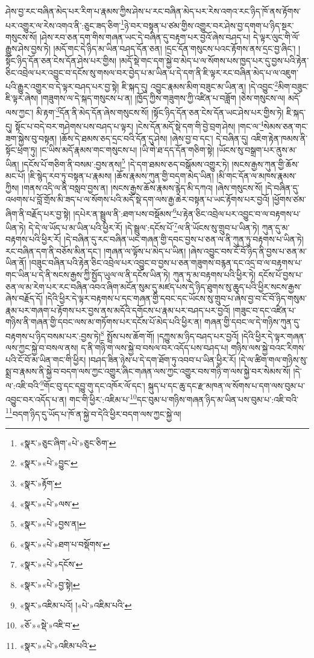 ཤེས་བྱ་རང་བཞིན་མེད་པར་རིག་པ་རྣམས་ཀྱིས་ཤེས་པ་རང་བཞིན་མེད་པར་རེས་འགའ་རང་ཉིད་ཁོ་ནས་རྟོགས་པར་འགྱུར་ལ་རེས་འགའ་ནི་:ཅུང་ཟད་ཅིག་\footnote{«སྣར་»ཅུང་ཞིག་«པེ་»ཅུང་ཅིག་}ཉེ་བར་བསྟན་པ་ཙམ་གྱིས་འགྱུར་བར་ཤེས་བྱ་དགག་པ་ཉིད་སྔར་གསུངས་སོ། །ཤེས་རབ་ཅན་དག་གིས་གཞན་ཡང་དེ་བཞིན་དུ་བརྟག་པར་བྱའོ་ཞེས་བཤད་པ། དེ་ལྟར་ལུང་གི་ལོ་རྒྱུས་ཤེས་བྱས་ཏེ། །མདོ་གང་དེ་ཉིད་མ་ཡིན་བཤད་དོན་ཅན། །དྲང་དོན་གསུངས་པའང་རྟོགས་ནས་དྲང་བྱ་ཞིང་། །སྟོང་ཉིད་དོན་ཅན་ངེས་དོན་ཤེས་པར་གྱིས། །མདོ་སྡེ་གང་དག་སྐྱེ་བ་མེད་པ་ལ་སོགས་པས་ཁྱད་པར་དུ་བྱས་པའི་རྟེན་ཅིང་འབྲེལ་པར་འབྱུང་བ་དངོས་སུ་གསལ་བར་བྱེད་པ་མ་ཡིན་པ་དེ་དག་ནི་ཇི་ལྟར་རང་བཞིན་མེད་པ་ལ་འཇུག་པའི་རྒྱུར་འགྱུར་བ་དེ་ལྟར་བཤད་པར་བྱ་སྟེ། ཇི་སྐད་དུ། འབྱུང་རྣམས་མིག་བཟུང་མ་ཡིན་ན། །དེ་འབྱུང་\footnote{«སྣར་»«པེ་»བྱུང་}མིག་བཟུང་ཇི་ལྟར་ཞེས། །གཟུགས་ལ་དེ་སྐད་གསུངས་པ་ན། །ཁྱོད་ཀྱིས་གཟུགས་ཀྱི་འཛིན་པ་བཟློག །ཅེས་གསུངས་ལ། མདོ་ལས་ཀྱང་། མི་རྟག་\footnote{«སྣར་»རྟོག་}དོན་ནི་མེད་དོན་ཞེས་གསུངས་སོ། །སྟོང་ཉིད་དོན་ཅན་ངེས་དོན་ཡང་ཤེས་པར་གྱིས་ཏེ། ཇི་སྐད་དུ། སྟོང་པ་བདེ་བར་གཤེགས་པས་བཤད་པ་ལྟར། །ངེས་དོན་མདོ་སྡེ་དག་གི་བྱེ་བྲག་ཤེས། །གང་ལ་\footnote{«སྣར་»«པེ་»ལས་}སེམས་ཅན་གང་ཟག་སྐྱེས་བུ་བསྟན། །ཆོས་དེ་ཐམས་ཅད་དྲང་བའི་དོན་དུ་ཤེས། །ཞེས་བྱ་བ་དང་། དེ་བཞིན་དུ། འཇིག་རྟེན་ཁམས་ནི་སྟོང་ཕྲག་ཏུ། །ང་ཡིས་མདོ་རྣམས་གང་གསུངས་པ། །ཡི་གེ་ཐ་དད་དོན་གཅིག་སྟེ། །ཡོངས་སུ་བསྒྲག་པར་ནུས་མ་ཡིན། །དངོས་པོ་གཅིག་ནི་བསམ་:བྱས་ནས།\footnote{«སྣར་»«པེ་»བྱས་ན།} །དེ་དག་ཐམས་ཅད་བསྒོམས་འགྱུར་ཏེ། །སངས་རྒྱས་ཀུན་གྱི་ཆོས་མང་པོ། །ཇི་སྙེད་རབ་ཏུ་བསྟན་པ་རྣམས། །ཆོས་རྣམས་ཀུན་གྱི་བདག་མེད་ཡིན། །མི་གང་དོན་ལ་མཁས་རྣམས་ཀྱིས། །གནས་འདི་ལ་ནི་བསླབ་བྱས་ན། །སངས་རྒྱས་ཆོས་རྣམས་རྙེད་མི་དཀའ། །ཞེས་གསུངས་སོ། །དེ་བཞིན་དུ་འཕགས་པ་བློ་གྲོས་མི་ཟད་པ་ལ་སོགས་པའི་མདོ་སྡེ་དག་ལས་རྒྱ་ཆེར་བསྟན་པ་ཡང་རྟོགས་པར་བྱའོ། །ཕྱོགས་ཙམ་ཞིག་ནི་བརྗོད་པར་བྱ་སྟེ། །དཔེར་ན་སྦྲུལ་ནི་:ཐག་པས་བསྡོམས་\footnote{«སྣར་»«པེ་»ཐག་པ་བསྡོགས་}པ་རྟེན་ཅིང་འབྲེལ་པར་འབྱུང་བ་ལ་བརྟགས་པ་ཡིན་ཏེ། དེ་དེ་ལ་ཡོད་པ་མ་ཡིན་པའི་ཕྱིར་རོ། །དེ་སྦྲུལ་:དངོས་པོ་\footnote{«སྣར་»«པེ་»དངོས་}ལ་ནི་ཡོངས་སུ་གྲུབ་པ་ཡིན་ཏེ། ཀུན་དུ་མ་བརྟགས་པའི་ཕྱིར་རོ། །དེ་བཞིན་དུ་རང་བཞིན་ཡང་གཞན་གྱི་དབང་བྱས་པ་ཅན་ལ་ནི་ཀུན་ཏུ་བརྟགས་པ་ཡིན་ཏེ། རང་བཞིན་དག་ནི་བཅོས་མིན་དང་། །གཞན་ལ་ལྟོས་པ་མེད་པ་ཡིན། །ཞེས་འབྱུང་བས་ངོ་བོ་ཉིད་ནི་བྱས་པ་ཅན་མ་ཡིན་ནོ། །བཟུང་བཞིན་པའི་རྟེན་ཅིང་འབྲེལ་པར་འབྱུང་བ་བྱས་པ་ཅན་གཟུགས་བརྙན་དང་འདྲ་བ་ལ་བརྟགས་པ་གང་ཡིན་པ་དེ་ནི་སངས་རྒྱས་ཀྱི་སྤྱོད་ཡུལ་ལ་ནི་དངོས་ཡིན་ཏེ། ཀུན་ཏུ་མ་བརྟགས་པའི་ཕྱིར་ཏེ། དངོས་པོ་བྱས་པ་ཅན་ལ་མ་རེག་པར་རང་བཞིན་འབའ་ཞིག་མངོན་སུམ་དུ་མཛད་པས་དེ་ཉིད་ཐུགས་སུ་ཆུད་པའི་ཕྱིར་སངས་རྒྱས་ཞེས་བརྗོད་དོ། །དེའི་ཕྱིར་དེ་ལྟར་བརྟགས་པ་དང་གཞན་གྱི་དབང་དང་ཡོངས་སུ་གྲུབ་པ་ཞེས་བྱ་བ་ངོ་བོ་ཉིད་གསུམ་རྣམ་པར་གཞག་པ་རྟོགས་པར་བྱས་ནས་མདོའི་དགོངས་པ་རྣམ་པར་བཤད་པར་བྱའོ། །གཟུང་བ་དང་འཛིན་པ་གཉིས་ནི་གཞན་གྱི་དབང་ལས་མ་གཏོགས་པར་དངོས་པོ་མེད་པའི་ཕྱིར་ན། གཞན་གྱི་དབང་ལ་དེ་གཉིས་ཀུན་དུ་བརྟགས་པ་ཉིད་བསམ་པར་:བྱས་ཏེ།\footnote{«སྣར་»«པེ་»བྱ་སྟེ།} སྤྲོས་པས་ཆོག་གོ། །དཀྱུས་མ་ཉིད་བཤད་པར་བྱའོ། །དེའི་ཕྱིར་དེ་ལྟར་གཞན་ལས་ཀྱང་སྐྱེ་བ་བསལ་ནས། ད་ནི་གཉི་ག་ལས་སྐྱེ་བ་བསལ་བར་འདོད་པས་བཤད་པ། གཉིས་ལས་སྐྱེ་བའང་རིགས་པའི་ངོ་བོ་མ་ཡིན་གང་གི་ཕྱིར། །བཤད་ཟིན་ཉེས་པ་དེ་དག་ཐོག་ཏུ་འབབ་པ་ཡིན་ཕྱིར་རོ། །དེ་ལ་ཚིག་གལ་གཉིས་སུ་སྨྲ་བ་རྣམས་ནི་སྐྱེ་བ་བདག་ལས་ཀྱང་འགྱུར་ཞིང་གཞན་ལས་ཀྱང་འགྱུར་བས་གཉི་ག་ལས་སྐྱེ་བར་སེམས་སོ། །དེ་ལ་:འཇི་བའི་\footnote{«སྣར་»འཇིམ་པའོ། །«པེ་»འཇིམ་པའི་}གོང་བུ་དང་དབྱུ་གུ་དང་འཁོར་ལོ་དང་། སྐུད་པ་དང་ཆུ་དང་རྫ་མཁན་ལ་སོགས་པ་དག་ལས་བུམ་པ་འབྱུང་བར་འདོད་པ་ན། གང་གི་ཕྱིར་:འཇིམ་པ་\footnote{«ཅོ་»«སྡེ་»འཇི་བ་}དང་བུམ་པ་གཉིས་གཞན་ཉིད་མ་ཡིན་པས་བུམ་པ་:འཇི་བའི་\footnote{«སྣར་»«པེ་»འཇིམ་པའི་}བདག་ཉིད་དུ་ཡོད་པ་ཁོ་ན་སྐྱེ་བ་དེའི་ཕྱིར་བདག་ལས་ཀྱང་སྐྱེ་ལ། 